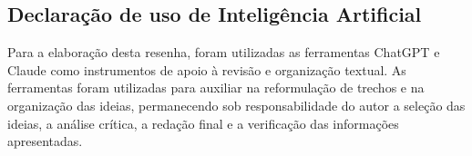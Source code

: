 \documentclass[12pt]{article}
\begin{document}
\vspace{4mm}

\begin{singlespace}
\section*{Declaração de uso de Inteligência Artificial}
Para a elaboração desta resenha, foram utilizadas as ferramentas
ChatGPT e Claude como instrumentos de apoio à revisão e organização
textual. As ferramentas foram utilizadas para auxiliar na reformulação
de trechos e na organização das ideias, permanecendo sob responsabilidade
do autor a seleção das ideias, a análise crítica, a redação final e a
verificação das informações apresentadas.
\end{singlespace}
\end{document}
